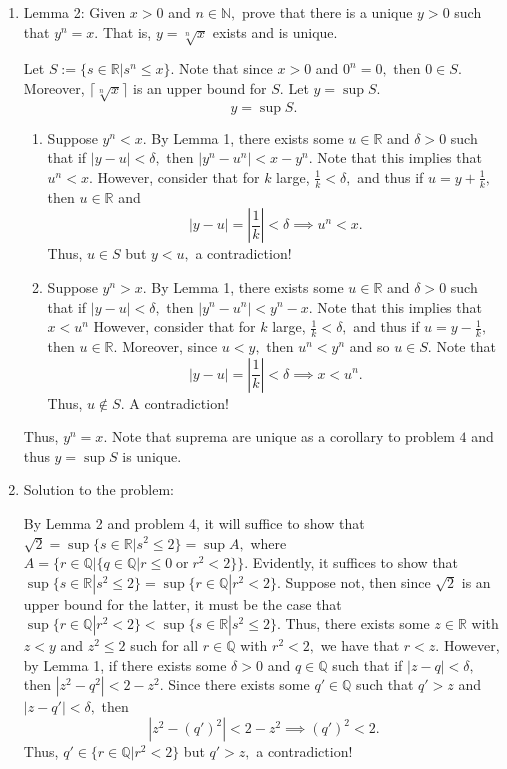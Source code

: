 \documentclass[11pt]{article}
\newcommand{\bbN}{\mathbb{N}}
\newcommand{\bbQ}{\mathbb{Q}}
\newcommand{\bbR}{\mathbb{R}}
\begin{document}
\begin{enumerate}
\begin{solution}
    \end{solution}
    \item \begin{problem}
    Lemma 2: Given $x>0$ and $n\in \bbN,$ prove that there is a unique $y>0$ such that $y^n = x.$ That is, $y = \sqrt[n]{x}$ exists and is unique.
    \end{problem}
        \begin{solution}
            Let $S := \{s\in \bbR | s^n \leq x\}.$ Note that since $x>0$ and $0^n = 0,$ then $0\in S.$ Moreover, $\lceil \sqrt[n]{x}\rceil$ is an upper bound for $S.$ Let $y = \sup S.$
            \[y = \sup S.\] 
            \begin{enumerate}
                \item Suppose $y^n <x.$ By Lemma 1, there exists some $u\in \bbR$ and $\delta>0$ such that if $|y-u|<\delta,$ then $|y^n - u^n| < x - y^n.$ Note that this implies that $u^n < x.$ However, consider that for $k$ large, $\frac{1}{k}< \delta,$ and thus if $u = y + \frac{1}{k},$ then $u\in \bbR$ and
                \[|y-u| = |\frac{1}{k}|< \delta \implies u^n < x.\] Thus, $u\in S$ but $y<u,$ a contradiction!
                \item Suppose $y^n>x.$ By Lemma 1, there exists some $u\in \bbR$ and $\delta>0$ such that if $|y-u|<\delta,$ then $|y^n - u^n| < y^n - x.$ Note that this implies that $x<u^n$ However, consider that for $k$ large, $\frac{1}{k}< \delta,$ and thus if $u = y - \frac{1}{k},$ then $u\in \bbR.$ Moreover, since $u<y,$ then $u^n <y^n$ and so $u\in S.$ Note that \[|y-u| = |\frac{1}{k}|< \delta \implies x < u^n.\] Thus, $u\notin S.$ A contradiction!
            \end{enumerate}
            Thus, $y^n = x.$ Note that suprema are unique as a corollary to problem $4$ and thus $y = \sup S$ is unique.
        \end{solution}
    \item Solution to the problem:
    \begin{solution}
        By Lemma 2 and problem 4, it will suffice to show that $\sqrt{2} = \sup\{s\in \bbR | s^2 \leq 2\} = \sup A,$ where $A = \{r\in \bbQ | \{q\in\bbQ | r\leq 0 \;\text{or}\; r^2<2\}\}.$ Evidently, it suffices to show that $\sup\{s\in \bbR | s^2 \leq 2\} = \sup\{r\in \bbQ | r^2 < 2\}.$ Suppose not, then since $\sqrt{2}$ is an upper bound for the latter, it must be the case that $\sup\{r\in \bbQ | r^2 < 2\}<\sup\{s\in \bbR | s^2 \leq 2\}.$ Thus, there exists some $z\in \bbR$ with $z<y$ and $z^2\leq 2$ such for all $r\in \bbQ$ with $r^2<2,$ we have that $r<z.$ However, by Lemma 1, if there exists some $\delta>0$ and $q\in \bbQ$ such that if $|z - q|< \delta,$ then $|z^2 - q^2|<2-z^2.$ Since there exists some $q'\in \bbQ$ such that $q'>z$ and $|z-q'|<\delta,$ then 
        \[|z^2 - (q')^2|<2-z^2 \implies (q')^2<2.\] Thus, $q'\in \{r\in \bbQ | r^2<2\}$ but $q'>z,$ a contradiction!
    \end{solution}

\end{enumerate}
\newpage
\end{document}
